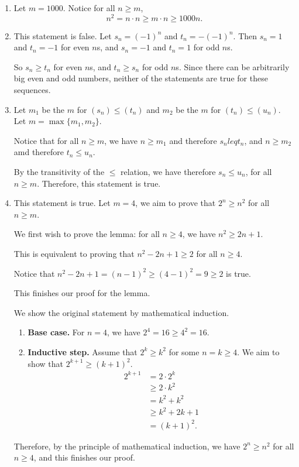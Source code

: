 \Question{\currfilebase}

\begin{enumerate}
    \item Let \(m = 1000\). Notice for all \(n \geq m\),
          \[
              n^2 = n \cdot n \geq m \cdot n \geq 1000n.
          \]

    \item This statement is false. Let \(s_n = (-1)^n\) and \(t_n = -(-1)^n\). Then \(s_n = 1\) and \(t_n = -1\) for even \(n\)s, and \(s_n = -1\) and \(t_n = 1\) for odd \(n\)s.

          So \(s_n \geq t_n\) for even \(n\)s, and \(t_n \geq s_n\) for odd \(n\)s. Since there can be arbitrarily big even and odd numbers, neither of the statements are true for these sequences.

    \item Let \(m_1\) be the \(m\) for \((s_n) \leq (t_n)\) and \(m_2\) be the \(m\) for \((t_n) \leq (u_n)\). Let \(m = \max\{m_1, m_2\}\).

          Notice that for all \(n \geq m\), we have \(n \geq m_1\) and therefore \(s_n leq t_n\), and \(n \geq m_2\) amd therefore \(t_n \leq u_n\).

          By the transitivity of the \(\leq\) relation, we have therefore \(s_n \leq u_n\), for all \(n \geq m\). Therefore, this statement is true.

    \item This statement is true. Let \(m = 4\), we aim to prove that \(2^n \geq n^2\) for all \(n \geq m\).

          We first wish to prove the lemma: for all \(n \geq 4\), we have \(n^2 \geq 2n + 1\).

          This is equivalent to proving that \(n^2 - 2n + 1 \geq 2\) for all \(n \geq 4\).

          Notice that \(n^2 - 2n + 1 = (n - 1)^2 \geq (4 - 1)^2 = 9 \geq 2\) is true.

          This finishes our proof for the lemma.

          We show the original statement by mathematical induction.

          \begin{enumerate}
              \item \textbf{Base case.} For \(n = 4\), we have \(2^4 = 16 \geq 4^2 = 16\).
              \item \textbf{Inductive step.} Assume that \(2^k \geq k^2\) for some \(n = k \geq 4\). We aim to show that \(2^{k+1} \geq (k+1)^2\).
                    \begin{align*}
                        2^{k+1} & = 2 \cdot 2^k     \\
                                & \geq 2 \cdot k^2  \\
                                & = k^2 + k^2       \\
                                & \geq k^2 + 2k + 1 \\
                                & = (k + 1)^2.
                    \end{align*}
          \end{enumerate}

          Therefore, by the principle of mathematical induction, we have \(2^n \geq n^2\) for all \(n \geq 4\), and this finishes our proof.
\end{enumerate}